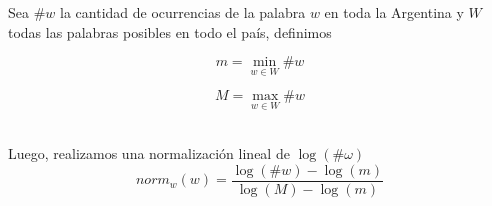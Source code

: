 
Sea $\# w$ la cantidad de ocurrencias de la palabra $w$ en toda la Argentina y $W$ todas las palabras posibles en todo el país, definimos


\noindent\begin{minipage}{.5\linewidth}
\begin{equation}
  m = \min \limits_{w \in W} \# w
\end{equation}
\end{minipage}%
\begin{minipage}{.5\linewidth}
\begin{equation}
  M = \max \limits_{w \in W} \# w
\end{equation}
\end{minipage}\\

Luego, realizamos una normalización lineal de $\log(\# \omega)$ 
\begin{equation}
  norm_w(w) = \frac{\log \left(\# w\right) - \log \left(m\right)}{\log \left(M\right) -\log \left(m\right)}
\end{equation}








